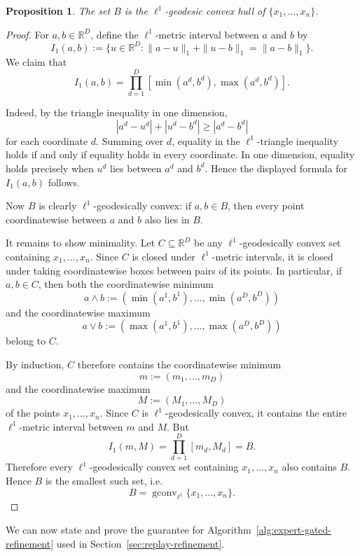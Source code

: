 \documentclass{article} %
\newtheorem{proposition}{Proposition}
\begin{document}
\begin{proposition}
\label{prop:l1-geodesic-box-hull}
The set \(B\) is the \(\ell^1\)-geodesic convex hull of
\(\{x_1,\dots,x_n\}\).
\end{proposition}

\begin{proof}
For \(a,b\in \mathbb{R}^D\), define the \(\ell^1\)-metric interval between
\(a\) and \(b\) by
\[
I_1(a,b)
:=
\{u\in\mathbb{R}^D:
\|a-u\|_1+\|u-b\|_1=\|a-b\|_1\}.
\]
We claim that
\[
I_1(a,b)
=
\prod_{d=1}^D
[\min(a^d,b^d),\max(a^d,b^d)].
\]

Indeed, by the triangle inequality in one dimension,
\[
|a^d-u^d|+|u^d-b^d|\ge |a^d-b^d|
\]
for each coordinate \(d\). Summing over \(d\), equality in the
\(\ell^1\)-triangle inequality holds if and only if equality holds in every
coordinate. In one dimension, equality holds precisely when \(u^d\) lies
between \(a^d\) and \(b^d\). Hence the displayed formula for \(I_1(a,b)\)
follows.

Now \(B\) is clearly \(\ell^1\)-geodesically convex: if \(a,b\in B\), then
every point coordinatewise between \(a\) and \(b\) also lies in \(B\).

It remains to show minimality. Let \(C\subseteq \mathbb{R}^D\) be any
\(\ell^1\)-geodesically convex set containing \(x_1,\dots,x_n\). Since
\(C\) is closed under \(\ell^1\)-metric intervals, it is closed under taking
coordinatewise boxes between pairs of its points. In particular, if
\(a,b\in C\), then both the coordinatewise minimum
\[
a\wedge b
:=
(\min(a^1,b^1),\dots,\min(a^D,b^D))
\]
and the coordinatewise maximum
\[
a\vee b
:=
(\max(a^1,b^1),\dots,\max(a^D,b^D))
\]
belong to \(C\).

By induction, \(C\) therefore contains the coordinatewise minimum
\[
m:=(m_1,\dots,m_D)
\]
and the coordinatewise maximum
\[
M:=(M_1,\dots,M_D)
\]
of the points \(x_1,\dots,x_n\). Since \(C\) is \(\ell^1\)-geodesically
convex, it contains the entire \(\ell^1\)-metric interval between \(m\) and
\(M\). But
\[
I_1(m,M)
=
\prod_{d=1}^D [m_d,M_d]
=
B.
\]
Therefore every \(\ell^1\)-geodesically convex set containing
\(x_1,\dots,x_n\) also contains \(B\). Hence \(B\) is the smallest such set,
i.e.
\[
B=\operatorname{gconv}_{\ell^1}\{x_1,\dots,x_n\}.
\]
\end{proof}


We can now state and prove the guarantee for Algorithm~\ref{alg:expert-gated-refinement} used in Section~\ref{sec:replay-refinement}.
\end{document}
